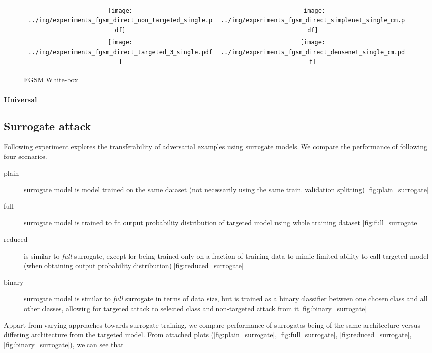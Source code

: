 \begin{figure}
\centering
\begin{tabular}{@{}cc@{}}
    \texttt{[image: ../img/experiments\_fgsm\_direct\_non\_targeted\_single.pdf]} &
    \texttt{[image: ../img/experiments\_fgsm\_direct\_simplenet\_single\_cm.pdf]} \\
    \texttt{[image: ../img/experiments\_fgsm\_direct\_targeted\_3\_single.pdf]}   &
    \texttt{[image: ../img/experiments\_fgsm\_direct\_densenet\_single\_cm.pdf]}  \\
\end{tabular}
\caption{FGSM White-box}
\label{fig:fgsm_white_box}
\end{figure}

\paragraph{Universal}

\subsection{Surrogate attack}
Following experiment explores the transferability of adversarial examples using surrogate models. We compare the performance of following four scenarios.

\begin{description}
\item[plain] surrogate model is model trained on the same dataset (not necessarily using the same train, validation splitting) \ref{fig:plain_surrogate}
\item[full] surrogate model is trained to fit output probability distribution of targeted model using whole training dataset \ref{fig:full_surrogate}
\item[reduced] is similar to \textit{full} surrogate, except for being trained only on a fraction of training data to mimic limited ability to call targeted model (when obtaining output probability distribution) \ref{fig:reduced_surrogate}
\item[binary] surrogate model is similar to \textit{full} surrogate in terms of data size, but is trained as a binary classifier between one chosen class and all other classes, allowing for targeted attack to selected class and non-targeted attack from it \ref{fig:binary_surrogate}
\end{description}
Appart from varying approaches towards surrogate training, we compare performance of surrogates being of the same architecture versus differing architecture from the targeted model.
From attached plots (\ref{fig:plain_surrogate}, \ref{fig:full_surrogate}, \ref{fig:reduced_surrogate}, \ref{fig:binary_surrogate}), we can see that

